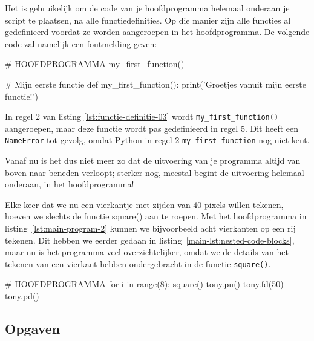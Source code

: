 \documentclass[../main]{subfiles}
\begin{document}
\begin{infobox}
    Het is gebruikelijk om de code van je hoofdprogramma helemaal onderaan je script te plaatsen, na alle functiedefinities. Op die manier zijn alle functies al gedefinieerd voordat ze worden aangeroepen in het hoofdprogramma. De volgende code zal namelijk een foutmelding geven:

    \begin{python}[style=mu, caption={Verkeerde volgorde}, label={lst:functie-definitie-03}, xleftmargin=.5cm]
# HOOFDPROGRAMMA
my_first_function()

# Mijn eerste functie
def my_first_function():
    print('Groetjes vanuit mijn eerste functie!')
    \end{python}

In regel 2 van  listing \ref{lst:functie-definitie-03} wordt \texttt{my\_first\_function()} aangeroepen, maar deze functie wordt pas gedefinieerd in regel 5. Dit heeft een \texttt{NameError} tot gevolg, omdat Python in regel 2 \texttt{my\_first\_function} nog niet kent.\par
\vspace{8pt}
Vanaf nu is het dus niet meer zo dat de uitvoering van je programma altijd van boven naar beneden verloopt; sterker nog, meestal begint de uitvoering helemaal onderaan, in het hoofdprogramma!
\end{infobox}

Elke keer dat we nu een vierkantje met zijden van 40 pixels willen tekenen, hoeven we slechts de functie square() aan te roepen. Met het hoofdprogramma in listing~\ref{lst:main-program-2} kunnen we bijvoorbeeld acht vierkanten op een rij tekenen. Dit hebben we eerder gedaan in listing~\ref{main-lst:nested-code-blocks}, maar nu is het programma veel overzichtelijker, omdat we de details van het tekenen van een vierkant hebben ondergebracht in de functie \texttt{square()}.

\begin{python}[style=mu, caption={Acht vierkanten op een rij}, label={lst:main-program-2}, firstnumber=11]
# HOOFDPROGRAMMA
for i in range(8):
    square()
    tony.pu()
    tony.fd(50)
    tony.pd()
\end{python}

\subsection*{Opgaven}
\end{document}
